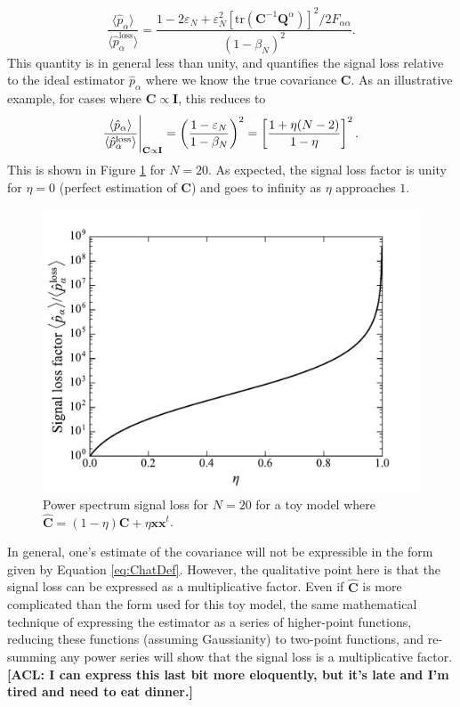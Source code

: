 \documentclass[preprint2,numberedappendix,tighten]{aastex6}  %
\newcommand{\x}{\mathbf{x}}
\newcommand{\C}{\mathbf{C}}
\newcommand{\Chat}{\mathbf{\hat{C}}}
\newcommand{\Q}{\mathbf{Q}}
\newcommand{\I}{\mathbf{I}}
\newcommand{\acl}[1]{{\color{red} \textbf{[ACL:  #1]}}}
\begin{document}
\begin{equation}
\frac{\langle \hat{p}_\alpha \rangle}{\langle \hat{p}_\alpha^\textrm{loss} \rangle} = \frac{1- 2\varepsilon_N + \varepsilon_N^2 \left[ \textrm{tr} (\C^{-1} \Q^\alpha) \right]^2 / 2F_{\alpha \alpha}}{(1-\beta_N)^2}.
\end{equation}
This quantity is in general less than unity, and quantifies the signal loss relative to the ideal estimator $\hat{p}_\alpha$ where we know the true covariance $\C$. As an illustrative example, for cases where $\C \propto \I$, this reduces to
\begin{equation}
\frac{\langle \hat{p}_\alpha \rangle}{\langle \hat{p}_\alpha^\textrm{loss} \rangle}  \Bigg{|}_{\C \propto \I} = \left( \frac{1-\varepsilon_N}{1-\beta_N} \right)^2 = \left[\frac{1+ \eta(N-2)}{1- \eta}\right]^2.
\end{equation}
This is shown in Figure \ref{fig:analytic_sig_loss} for $N=20$. As expected, the signal loss factor is unity for $\eta=0$ (perfect estimation of $\C$) and goes to infinity as $\eta$ approaches $1$.
\begin{figure}
	\centering
	\includegraphics[width=0.6\columnwidth]{plots/analytic_sig_loss.pdf}
	\caption{Power spectrum signal loss for $N=20$ for a toy model where $\Chat = (1-\eta) \C + \eta \x \x^t$.}
	\label{fig:analytic_sig_loss}
\end{figure}

In general, one's estimate of the covariance will not be expressible in the form given by Equation \eqref{eq:ChatDef}. However, the qualitative point here is that the signal loss can be expressed as a multiplicative factor. Even if $\Chat$ is more complicated than the form used for this toy model, the same mathematical technique of expressing the estimator as a series of higher-point functions, reducing these functions (assuming Gaussianity) to two-point functions, and re-summing any power series will show that the signal loss is a multiplicative factor. \acl{I can express this last bit more eloquently, but it's late and I'm tired and need to eat dinner.}




\end{document}
